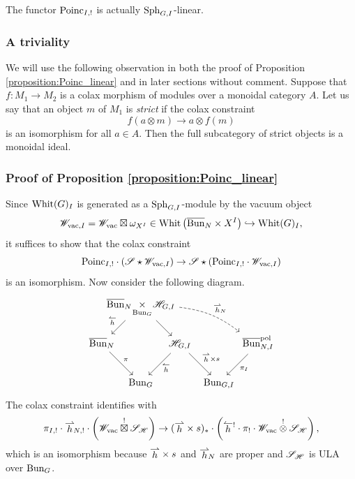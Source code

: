 \begin{proposition}
\label{proposition:Poinc_linear}
The functor $\mathrm{Poinc}_{I,!}$ is actually $\mathrm{Sph}_{G,I}$-linear.
\end{proposition}

\subsubsection{A triviality} We will use the following observation in both the proof of Proposition \ref{proposition:Poinc_linear} and in later sections without comment. Suppose that $f : M_1 \to M_2$ is a colax morphism of modules over a monoidal category $A$. Let us say that an object $m$ of $M_1$ is \emph{strict} if the colax constraint
  \[f(a \otimes m) \to a \otimes f(m)\]
is an isomorphism for all $a \in A$. Then the full subcategory of strict objects is a monoidal ideal.

\subsubsection{Proof of Proposition \ref{proposition:Poinc_linear}} Since $\mathrm{Whit}(G)_I$ is generated as a $\mathrm{Sph}_{G,I}$-module by the vacuum object
    \[\mathscr{W}_{\mathrm{vac}, I} = \mathscr{W}_{\mathrm{vac}} \boxtimes \omega_{X^I} \in \mathrm{Whit}\left(\overline{\mathrm{Bun}}_N \times X^I\right) \hookrightarrow \mathrm{Whit}(G)_I,\]
it suffices to show that the colax constraint
    \[\mathrm{Poinc}_{I,!} \cdot (\mathscr{S} \star \mathscr{W}_{\mathrm{vac},I})
    \to \mathscr{S} \star \left( \mathrm{Poinc}_{I,!} \cdot \mathscr{W}_{\mathrm{vac},I} \right)\]
is an isomorphism. Now consider the following diagram.
\[
\begin{tikzcd}[
      column sep={4em,between origins},
      row sep={4em,between origins}
    ]
    & \Bunc_N \!\underset{\Bun_G}{\times}\! \HH_{G,I} \arrow[dl, "\hl" above left] \arrow[dr] \arrow[drrr, bend left=15, dashed, "\hr_{\!N}"] & & & \\
  \Bunc_N \arrow[dr, "\pi"] & & \HH_{G,I} \arrow[dl, "\hl"] \arrow[dr, "\hr \times s"] & & \Bunc_{N,I}^\pol \arrow[dl, "\pi_I"] \\
    & \Bun_G & & \Bun_{G,I} & 
\end{tikzcd}
\]
The colax constraint identifies with
\[
    \pi_{I,!} \cdot \hr_{\!N,!} \cdot \left( \WW_\vac \shoximes \SS_\HH \right)
    \to (\hr \times s)_* \cdot \left( \hl^! \cdot \pi_! \cdot \WW_\vac \shimes \SS_\HH \right),
\]
which is an isomorphism because $\hr \times s$ and $\hr_{\!N}$ are proper and $\mathscr{S}_{\mathscr{H}}$ is ULA over $\mathrm{Bun}_G$.

